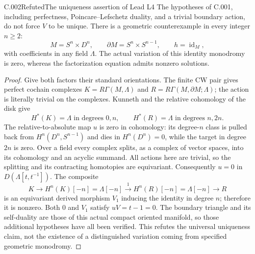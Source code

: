 
\begin{saresult}{C.002}{Refuted}{The uniqueness assertion of Lead L4}
The hypotheses of C.001, including perfectness, Poincare--Lefschetz duality,
and a trivial boundary action, do not force $V$ to be unique.
There is a geometric counterexample in every integer $n\geq2$:
\[
 M=S^n\times D^n,\qquad \partial M=S^n\times S^{n-1},
 \qquad h=\operatorname{id}_M,
\]
with coefficients in any field $\Lambda$.
The actual variation of this identity monodromy is zero, whereas the factorization equation admits nonzero solutions.
\end{saresult}
\begin{proof}
Give both factors their standard orientations. The finite CW pair gives perfect
cochain complexes $K=R\Gamma(M,\Lambda)$ and
$R=R\Gamma(M,\partial M;\Lambda)$; the action is literally trivial on the complexes.
Kunneth and the relative cohomology of the disk give
\[
 H^*(K)=\Lambda\text{ in degrees }0,n,
 \qquad H^*(R)=\Lambda\text{ in degrees }n,2n.
\]
The relative-to-absolute map $u$ is zero in cohomology: its degree-$n$
class is pulled back from $H^n(D^n,S^{n-1})$ and dies in
$H^n(D^n)=0$, while the target in degree $2n$ is zero.
Over a field every complex splits, as a complex of vector spaces, into
its cohomology and an acyclic summand. All actions here are trivial,
so the splitting and its contracting homotopies are equivariant.
Consequently $u=0$ in $D(\Lambda[t,t^{-1}])$.
The composite
\[
 K\longrightarrow H^n(K)[-n]=\Lambda[-n]
 \xrightarrow{1}H^n(R)[-n]=\Lambda[-n]\longrightarrow R
\]
is an equivariant derived morphism $V_1$ inducing the identity in degree $n$;
therefore it is nonzero. Both $0$ and $V_1$ satisfy $uV=t-1=0$.
The boundary triangle and its self-duality are those of this actual compact
oriented manifold, so those additional hypotheses have all been verified.
This refutes the universal uniqueness claim, not the existence of a distinguished
variation coming from specified geometric monodromy.
\end{proof}

